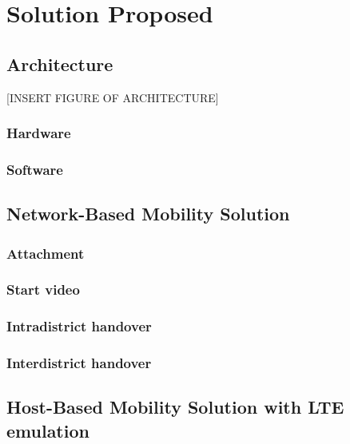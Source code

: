 \chapter{Solution Proposed}\label{chap:4}

\section{Architecture}\label{sec:chap4_arch}

[INSERT FIGURE OF ARCHITECTURE]

\subsection{Hardware}\label{sec:chap4_arch_hard}

\subsection{Software}\label{sec:chap4_arch_soft}

\section{Network-Based Mobility Solution}\label{sec:chap4_net_based}

\subsection{Attachment}\label{sec:chap4_net_based_attach}

\subsection{Start video}\label{sec:chap4_net_based_video}

\subsection{Intradistrict handover}\label{sec:chap4_net_based_intra}

\subsection{Interdistrict handover}\label{sec:chap4_net_based_inter}

\section{Host-Based Mobility Solution with LTE emulation}\label{sec:chap4_host_based}

